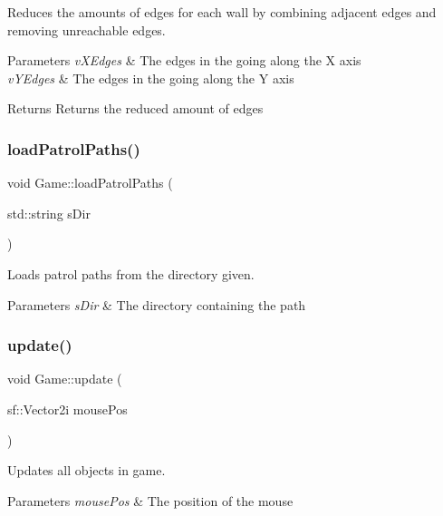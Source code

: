 Reduces the amounts of edges for each wall by combining adjacent edges and removing unreachable edges. 


\begin{DoxyParams}{Parameters}
{\em v\+X\+Edges} & The edges in the going along the X axis \\
\hline
{\em v\+Y\+Edges} & The edges in the going along the Y axis \\
\hline
\end{DoxyParams}
\begin{DoxyReturn}{Returns}
Returns the reduced amount of edges 
\end{DoxyReturn}
\mbox{\label{class_game_a0caffc2dae20f8c6679f2753c99bcae7}} 
\subsubsection{\texorpdfstring{load\+Patrol\+Paths()}{loadPatrolPaths()}}
{\footnotesize\ttfamily void Game\+::load\+Patrol\+Paths (\begin{DoxyParamCaption}\item[{std\+::string}]{s\+Dir }\end{DoxyParamCaption})}



Loads patrol paths from the directory given. 


\begin{DoxyParams}{Parameters}
{\em s\+Dir} & The directory containing the path \\
\hline
\end{DoxyParams}
\mbox{\label{class_game_a5cc8d82415814daa1dd4257c15c88215}} 
\subsubsection{\texorpdfstring{update()}{update()}}
{\footnotesize\ttfamily void Game\+::update (\begin{DoxyParamCaption}\item[{sf\+::\+Vector2i}]{mouse\+Pos }\end{DoxyParamCaption})}



Updates all objects in game. 


\begin{DoxyParams}{Parameters}
{\em mouse\+Pos} & The position of the mouse \\
\hline
\end{DoxyParams}


